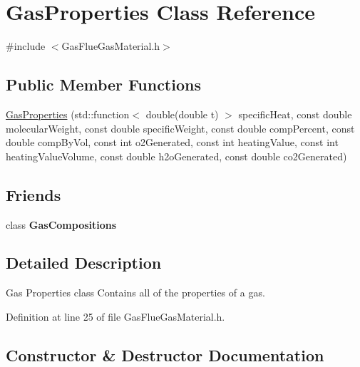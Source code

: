 \hypertarget{class_gas_properties}{}\section{Gas\+Properties Class Reference}
\label{class_gas_properties}


{\ttfamily \#include $<$Gas\+Flue\+Gas\+Material.\+h$>$}

\subsection*{Public Member Functions}
\begin{DoxyCompactItemize}
\item 
\hyperlink{class_gas_properties_a8959cd25ac00e9e0e75cd957eca74e5e}{Gas\+Properties} (std\+::function$<$ double(double t) $>$ specific\+Heat, const double molecular\+Weight, const double specific\+Weight, const double comp\+Percent, const double comp\+By\+Vol, const int o2\+Generated, const int heating\+Value, const int heating\+Value\+Volume, const double h2o\+Generated, const double co2\+Generated)
\end{DoxyCompactItemize}
\subsection*{Friends}
\begin{DoxyCompactItemize}
\item 
\mbox{\label{class_gas_properties_a06c8fecbbd02620ff1ebf3d1cb48d14a}} 
class {\bfseries Gas\+Compositions}
\end{DoxyCompactItemize}


\subsection{Detailed Description}
Gas Properties class Contains all of the properties of a gas. 

Definition at line 25 of file Gas\+Flue\+Gas\+Material.\+h.



\subsection{Constructor \& Destructor Documentation}
\mbox{\label{class_gas_properties_a8959cd25ac00e9e0e75cd957eca74e5e}} 

